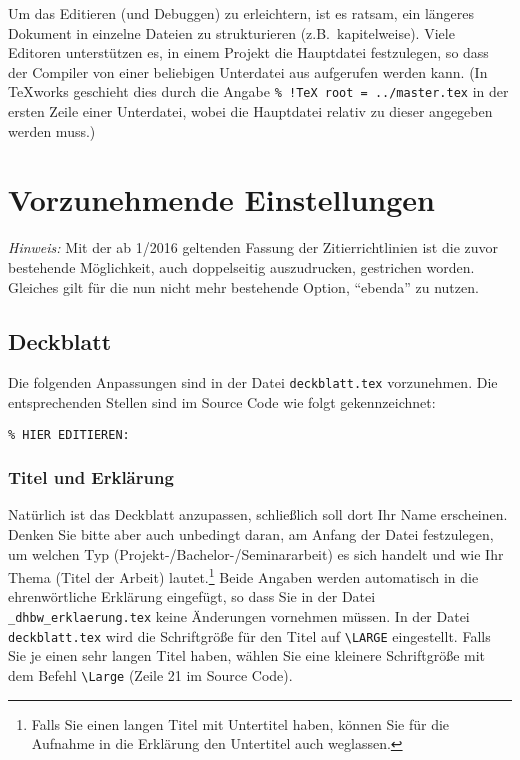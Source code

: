 Um das Editieren (und Debuggen) zu erleichtern, ist es ratsam, ein längeres Dokument in einzelne Dateien zu strukturieren (z.B.\ kapitelweise). Viele Editoren unterstützen es, in einem Projekt die Hauptdatei festzulegen, so dass der Compiler von einer beliebigen Unterdatei aus aufgerufen werden kann. (In TeXworks geschieht dies durch die Angabe \verb|% !TeX root = ../master.tex| in der ersten Zeile einer Unterdatei, wobei die Hauptdatei relativ zu dieser angegeben werden muss.)

\section{Vorzunehmende Einstellungen}

\emph{Hinweis:} Mit der ab 1/2016 geltenden Fassung der Zitierrichtlinien ist die zuvor bestehende Möglichkeit, auch doppelseitig auszudrucken, gestrichen worden. Gleiches gilt für die nun nicht mehr bestehende Option, \enquote{ebenda} zu nutzen.

\subsection{Deckblatt}

Die folgenden Anpassungen sind in der Datei \verb|deckblatt.tex| vorzunehmen. Die entsprechenden Stellen sind im Source Code wie folgt gekennzeichnet:
\lstset{language=TeX} 
\begin{lstlisting}
% HIER EDITIEREN: 
\end{lstlisting}

\subsubsection{Titel und Erklärung}
Natürlich ist das Deckblatt anzupassen, schließlich soll dort Ihr Name erscheinen. Denken Sie bitte aber auch unbedingt daran, am Anfang der Datei festzulegen, um welchen Typ (Projekt-/Bachelor-/Seminararbeit) es sich handelt und wie Ihr Thema (Titel der Arbeit) lautet.\footnote{%
Falls Sie einen langen Titel mit Untertitel haben, können Sie für die Aufnahme in die Erklärung den Untertitel auch weglassen.} Beide Angaben werden automatisch in die ehrenwörtliche Erklärung eingefügt, so dass Sie in der Datei \verb|_dhbw_erklaerung.tex| keine Änderungen vornehmen müssen.
In der Datei \verb|deckblatt.tex| wird die Schriftgröße für den Titel auf \verb|\LARGE| eingestellt. Falls Sie je einen sehr langen Titel haben, wählen Sie eine kleinere Schriftgröße mit dem Befehl \verb|\Large| (Zeile 21 im Source Code).

